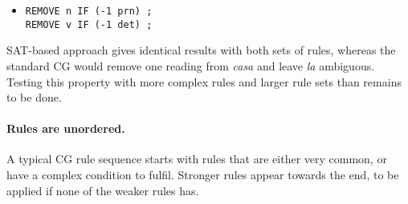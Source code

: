 \documentclass[11pt]{article}
\newcommand{\todo}[1]{{\color{cyan}\textbf{[TODO: }#1\textbf{]}}}
\begin{document}
\begin{itemize}
\item [] \texttt{REMOVE n IF (-1 prn) ;} \\
             \texttt{REMOVE v IF (-1 det) ;}
\end{itemize}

SAT-based approach gives identical results with both sets of rules,
whereas the standard CG would remove one reading from \emph{casa} and leave \emph{la} ambiguous.
Testing this property with more complex rules and larger rule sets than remains to be done.


\paragraph{Rules are unordered.}
A typical CG rule sequence starts with rules that are either very common, or have a complex condition to fulfil.
Stronger rules appear towards the end, to be applied if none of the weaker rules has. 

\end{document}
